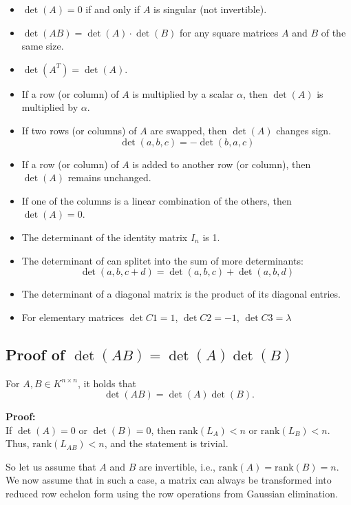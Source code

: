 \begin{itemize}[label=\(-\)]
    \item \(\det(A) = 0\) if and only if \(A\) is singular (not invertible).
    \item \(\det(AB) = \det(A) \cdot \det(B)\) for any square matrices \(A\) and \(B\) of the same size.
    \item \(\det(A^T) = \det(A)\).
    \item If a row (or column) of \(A\) is multiplied by a scalar \(\alpha\), 
    then \(\det(A)\) is multiplied by \(\alpha\).
    \item If two rows (or columns) of \(A\) are swapped, then \(\det(A)\) changes sign.
    \[\det(a,b,c) = - \det(b,a,c)\]
    \item If a row (or column) of \(A\) is added to another row (or column), then \(\det(A)\) remains unchanged.
    \item If one of the columns is a linear combination of the others, then \(\det(A) = 0\).
    \item The determinant of the identity matrix \(I_n\) is 1.
    \item The determinant of can splitet into the sum of more determinants:
    \[
    \det(a,b,c + d) = \det(a,b,c) + \det(a,b,d)
    \]
    \item The determinant of a diagonal matrix is the product of its diagonal entries.
    \item For elementary matrices \(\det C1 = 1\), \(\det C2 = -1\), \(\det C3 = \lambda\)
\end{itemize}

\subsection{Proof of \(\det(AB) = \det(A) \det(B)\)}

For \( A, B \in K^{n \times n} \), it holds that
\[
\det(AB) = \det(A)\det(B).
\]

\textbf{Proof:} \\
If \( \det(A) = 0 \) or \( \det(B) = 0 \), 
then \( \text{rank}(L_A) < n \) or \( \text{rank}(L_B) < n \). \\
Thus, \( \text{rank}(L_{AB}) < n \), 
and the statement is trivial.

So let us assume that \( A \) and \( B \) are 
invertible, i.e., \( \text{rank}(A) = \text{rank}(B) = n \). \\
We now assume that in such a case, a matrix can 
always be transformed into reduced row 
echelon form using the row operations 
from Gaussian elimination.

